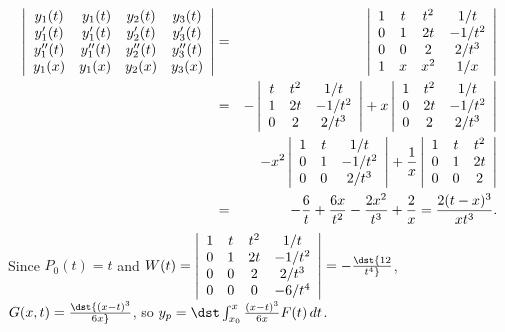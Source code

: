 \documentclass[dvips]{book}
\renewcommand{\exer}[1]{\par\medskip\;\noindent{\color{red}\bf #1.}}
\numberwithin{example}{section}
\numberwithin{equation}{section}
\numberwithin{theorem}{section}
\numberwithin{table}{section}
\numberwithin{figure}{section}
\begin{document}
\exer{9.4.40}
\begin{eqnarray*}
\left|\begin{array}{crcc}
y_1(t)&y_1(t)&y_2(t)&y_3(t)\\
y_1'(t)&y_1'(t)&y_2'(t)&y_3'(t)\\
y_1''(t)&y_1''(t)&y_2''(t)&y_3''(t)\\
y_1(x)&y_1(x)&y_2(x)&y_3(x)
\end{array}\right|&=&
\left|\begin{array}{cccc}
1&t&t^2&1/t\\
0&1&2t&-1/t^2\\
0&0&2&2/t^3\\
1&x&x^2&1/x\\
\end{array}\right|\\
&=&-\left|\begin{array}{cccc}
t&t^2&1/t\\
1&2t&-1/t^2\\
0&2&2/t^3\end{array}\right|
+x\left|\begin{array}{cccc}
1&t^2&1/t\\
0&2t&-1/t^2\\
0&2&2/t^3
\end{array}\right|\\
&&-x^2\left|\begin{array}{cccc}
1&t&1/t\\0&1&-1/t^2\\
0&0&2/t^3\end{array}\right|
+{1\over x}\left|\begin{array}{cccc}
1&t&t^2\\0&1&2t\\0&0&2\end{array}\right|\\
&=&-{6\over t}+{6x\over t^2}-{2x^2\over t^3}+{2\over x}
={2(t-x)^3\over xt^3}.
\end{eqnarray*}
Since $P_0(t)=t$ and
$W(t)=\left|\begin{array}{cccc}
1&t&t^2&1/t\\
0&1&2t&-1/t^2\\
0&0&2&2/t^3\\
0&0&0&-6/t^4
\end{array}\right|=-\dst{12\over t^4}$,
$G(x,t)=\dst{(x-t)^3\over6x}$, so
$y_p=\dst\int_{x_0}^x {(x-t)^3\over6x}F(t)\,dt$.
\end{document}
